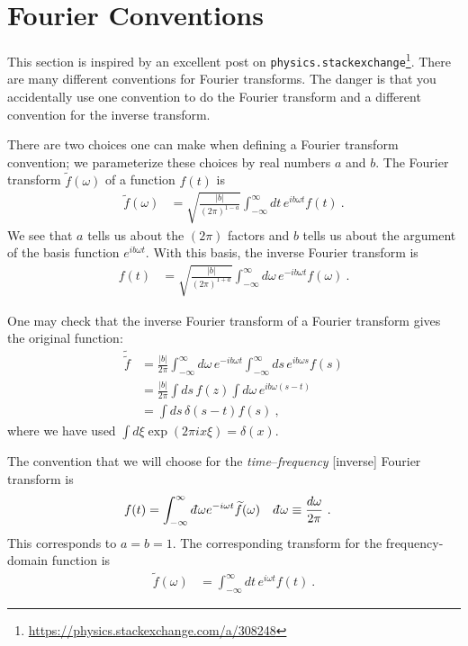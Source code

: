 
\section{Fourier Conventions}
\label{app:Fourier}

This section is inspired by an excellent post on \texttt{physics.stackexchange}\footnote{\url{https://physics.stackexchange.com/a/308248}}. There are many different conventions for Fourier transforms. The danger is that you accidentally use one convention to do the Fourier transform and a different convention for the inverse transform. 

There are two choices one can make when defining a Fourier transform convention; we parameterize these choices by real numbers $a$ and $b$. The Fourier transform $\tilde f(\omega)$ of a function $f(t)$ is
\begin{align}
	\tilde f(\omega)
	&= 
	\sqrt{\frac{|b|}{(2\pi)^{1-a}}}
	\int_{-\infty}^\infty dt\, e^{ib\omega t} f(t) \ .
\end{align}
We see that $a$ tells us about the $(2\pi)$ factors and $b$ tells us about the argument of the basis function $e^{ib\omega t}$. With this basis, the inverse Fourier transform is 
\begin{align}
	f(t)&=
	\sqrt{\frac{|b|}{(2\pi)^{1+a}}}
	\int_{-\infty}^\infty d\omega\, e^{-ib\omega t} f(\omega) \ .
\end{align}

One may check that the inverse Fourier transform of a Fourier transform gives the original function:
\begin{align}
	\tilde{\tilde f} &=
	\frac{|b|}{2\pi}
	\int_{-\infty}^\infty d\omega\, e^{-ib\omega t}
	\int_{-\infty}^{\infty}
	ds\, e^{ib\omega s} f(s)
	\\
	&= 
	\frac{|b|}{2\pi}
	\int ds\, f(z) \int d\omega \, e^{ib\omega(s-t)}
	\\
	&= \int ds\, \delta(s-t) f(s) \ ,
\end{align}
where we have used $\int d\xi \exp(2\pi i x\xi) = \delta(x)$. 

The convention that we will choose for the \emph{time}--\emph{frequency} [inverse] Fourier transform is
\begin{align}
	f(t) &= \int_{-\infty}^{\infty} \dbar\omega e^{-i\omega t} \tilde f(\omega)
	&
	\dbar \omega &\equiv\frac{d\omega}{2\pi} \ .
\end{align}
This corresponds to $a=b=1$. The corresponding transform for the frequency-domain function is
\begin{align}
	\tilde f(\omega) &= 
	\int_{-\infty}^\infty d t\, e^{i\omega t} f(t) \ .
	\label{eq:inverse:fourier:convention}
\end{align}



